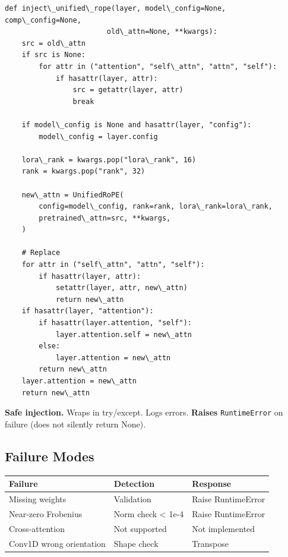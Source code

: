 \begin{lstlisting}
def inject\_unified\_rope(layer, model\_config=None, comp\_config=None,
                        old\_attn=None, **kwargs):
    src = old\_attn
    if src is None:
        for attr in ("attention", "self\_attn", "attn", "self"):
            if hasattr(layer, attr):
                src = getattr(layer, attr)
                break
    
    if model\_config is None and hasattr(layer, "config"):
        model\_config = layer.config
    
    lora\_rank = kwargs.pop("lora\_rank", 16)
    rank = kwargs.pop("rank", 32)
    
    new\_attn = UnifiedRoPE(
        config=model\_config, rank=rank, lora\_rank=lora\_rank,
        pretrained\_attn=src, **kwargs,
    )
    
    # Replace
    for attr in ("self\_attn", "attn", "self"):
        if hasattr(layer, attr):
            setattr(layer, attr, new\_attn)
            return new\_attn
    if hasattr(layer, "attention"):
        if hasattr(layer.attention, "self"):
            layer.attention.self = new\_attn
        else:
            layer.attention = new\_attn
        return new\_attn
    layer.attention = new\_attn
    return new\_attn
\end{lstlisting}

\textbf{Safe injection.} Wraps in try/except. Logs errors. \textbf{Raises} 
\texttt{RuntimeError} on failure (does not silently return None).

\subsection{Failure Modes}

\begin{table}[H]
\centering
\small
\begin{tabular}{lll}
\toprule
\textbf{Failure} & \textbf{Detection} & \textbf{Response} \\
\midrule
Missing weights & Validation & Raise RuntimeError \\
Near-zero Frobenius & Norm check \textless{} 1e-4 & Raise RuntimeError \\
Cross-attention & Not supported & Not implemented \\
Conv1D wrong orientation & Shape check & Transpose \\
\bottomrule
\end{tabular}
\end{table}

